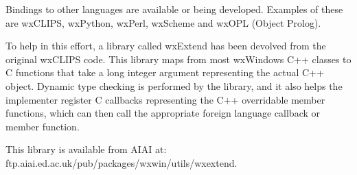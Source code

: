 Bindings to other languages are available or being developed. Examples of these
are wxCLIPS, wxPython, wxPerl, wxScheme and wxOPL (Object Prolog).

To help in this effort, a library called wxExtend has been devolved
from the original wxCLIPS code. This library maps from most
wxWindows C++ classes to C functions that take a long integer argument
representing the actual C++ object. Dynamic type checking is performed
by the library, and it also helps the implementer register
C callbacks representing the C++ overridable member functions,
which can then call the appropriate foreign language callback or
member function.

This library is available from AIAI at:\\
ftp.aiai.ed.ac.uk/pub/packages/wxwin/utils/wxextend.


\printindex
{}%
\setfooter{\thepage}{}{}{}{}{\thepage}



